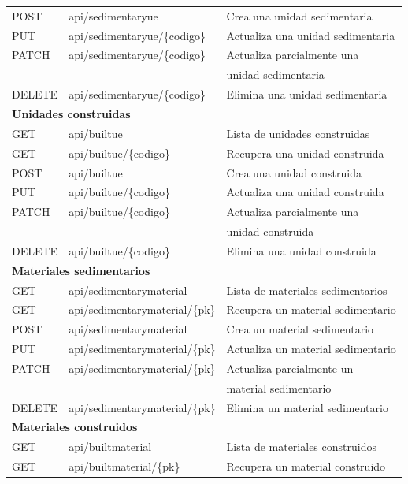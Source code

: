 \begin{longtable}[H]{|l|l|l|}
    POST & api/sedimentaryue & Crea una unidad sedimentaria \\
    PUT & api/sedimentaryue/\{codigo\} & Actualiza una unidad sedimentaria \\
    PATCH & api/sedimentaryue/\{codigo\} & Actualiza parcialmente una \\
    &  & unidad sedimentaria \\
    DELETE & api/sedimentaryue/\{codigo\} & Elimina una unidad sedimentaria \\
    \hline\hline
    \multicolumn{3}{|l|}{\textbf{Unidades construidas}} \\
    \hline
    GET & api/builtue & Lista de unidades construidas \\
    GET & api/builtue/\{codigo\} & Recupera una unidad construida \\
    POST & api/builtue & Crea una unidad construida \\
    PUT & api/builtue/\{codigo\} & Actualiza una unidad construida \\
    PATCH & api/builtue/\{codigo\} & Actualiza parcialmente una \\
    &  & unidad construida \\
    DELETE & api/builtue/\{codigo\} & Elimina una unidad construida \\
    \hline\hline
    \multicolumn{3}{|l|}{\textbf{Materiales sedimentarios}} \\
    \hline
    GET & api/sedimentarymaterial & Lista de materiales sedimentarios \\
    GET & api/sedimentarymaterial/\{pk\} & Recupera un material sedimentario \\
    POST & api/sedimentarymaterial & Crea un material sedimentario \\
    PUT & api/sedimentarymaterial/\{pk\} & Actualiza un material sedimentario \\
    PATCH & api/sedimentarymaterial/\{pk\} & Actualiza parcialmente un \\
    &  & material sedimentario \\
    DELETE & api/sedimentarymaterial/\{pk\} & Elimina un material sedimentario \\
    \hline\hline
    \multicolumn{3}{|l|}{\textbf{Materiales construidos}} \\
    \hline
    GET & api/builtmaterial & Lista de materiales construidos \\
    GET & api/builtmaterial/\{pk\} & Recupera un material construido \\

\end{longtable}
